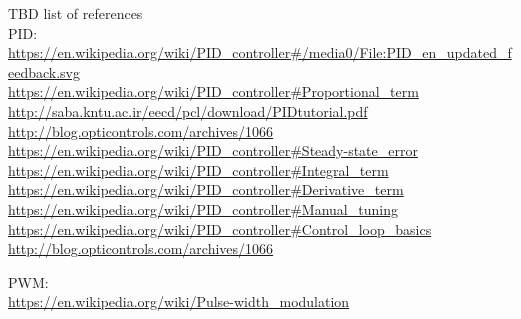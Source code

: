 TBD list of references \\

PID: \\
\url{https://en.wikipedia.org/wiki/PID_controller#/media0/File:PID_en_updated_feedback.svg}\\

\url{https://en.wikipedia.org/wiki/PID_controller#Proportional_term}\\

\url{http://saba.kntu.ac.ir/eecd/pcl/download/PIDtutorial.pdf}\\

\url{http://blog.opticontrols.com/archives/1066}\\

\url{https://en.wikipedia.org/wiki/PID_controller#Steady-state_error}\\

\url{https://en.wikipedia.org/wiki/PID_controller#Integral_term}\\

\url{https://en.wikipedia.org/wiki/PID_controller#Derivative_term}\\

\url{https://en.wikipedia.org/wiki/PID_controller#Manual_tuning}\\

\url{https://en.wikipedia.org/wiki/PID_controller#Control_loop_basics}\\

\url{http://blog.opticontrols.com/archives/1066}

PWM:\\

\url{https://en.wikipedia.org/wiki/Pulse-width_modulation}\\
